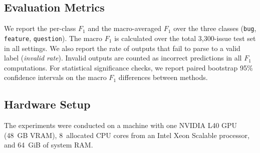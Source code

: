 \subsection{Evaluation Metrics}
\label{sec:setup-metrics}
We report the per-class $F_1$ and the macro-averaged $F_1$ over the three classes (\texttt{bug}, \texttt{feature}, \texttt{question}). The macro $F_1$ is calculated over the total 3{,}300-issue test set in all settings. We also report the rate of outputs that fail to parse to a valid label (\textit{invalid rate}). Invalid outputs are counted as incorrect predictions in all $F_1$ computations. For statistical significance checks, we report paired bootstrap 95\% confidence intervals on the macro $F_1$ differences between methods.

\subsection{Hardware Setup}
\label{sec:setup-hardware}
The experiments were conducted on a machine with one NVIDIA L40 GPU (48~GB VRAM), 8~allocated CPU cores from an Intel Xeon Scalable processor, and 64~GiB of system RAM.
